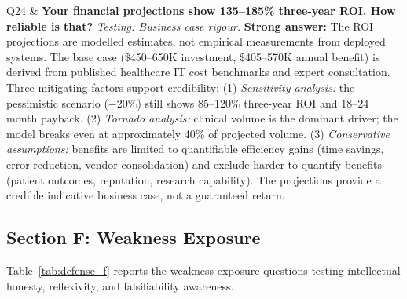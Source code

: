 \begin{xltabular}
Q24 & \textbf{Your financial projections show 135--185\% three-year ROI. How reliable is that?} \newline
\textit{Testing: Business case rigour.} \newline\newline
\textbf{Strong answer:} The ROI projections are modelled estimates, not empirical measurements from deployed systems. The base case (\$450--650K investment, \$405--570K annual benefit) is derived from published healthcare IT cost benchmarks and expert consultation. Three mitigating factors support credibility: (1) \textit{Sensitivity analysis:} the pessimistic scenario ($-$20\%) still shows 85--120\% three-year ROI and 18--24 month payback. (2) \textit{Tornado analysis:} clinical volume is the dominant driver; the model breaks even at approximately 40\% of projected volume. (3) \textit{Conservative assumptions:} benefits are limited to quantifiable efficiency gains (time savings, error reduction, vendor consolidation) and exclude harder-to-quantify benefits (patient outcomes, reputation, research capability). The projections provide a credible indicative business case, not a guaranteed return. \\

\end{xltabular}

\subsection{Section F: Weakness Exposure}

\noindent Table~\ref{tab:defense_f} reports the weakness exposure questions testing intellectual honesty, reflexivity, and falsifiability awareness.

